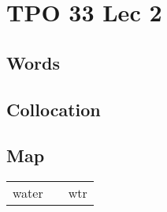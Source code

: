 \section{TPO 33 Lec 2}

\subsection{Words}

\subsection{Collocation}

\subsection{Map}

\begin{tabular}{rc@{\quad$\to$\quad}l}
    water &  & wtr \\
\end{tabular}
